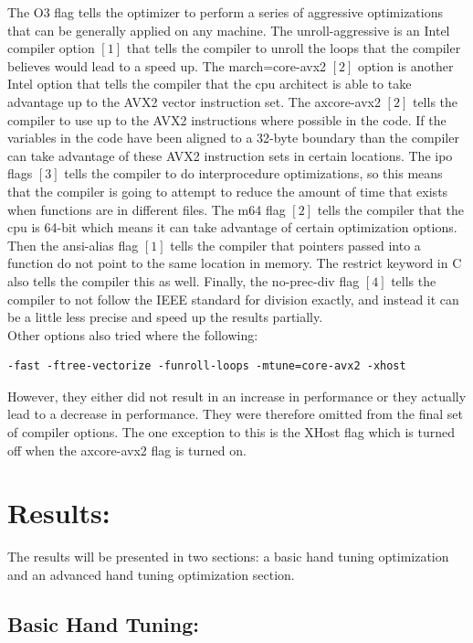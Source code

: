 \documentclass{article}
\begin{document}
The O3 flag tells the optimizer to perform a series of aggressive optimizations that can be generally applied on any machine. The unroll-aggressive is an Intel compiler option $[1]$ that tells the compiler to unroll the loops that the compiler believes would lead to a speed up. The march=core-avx2 $[2]$ option is another Intel option that tells the compiler that the cpu architect is able to take advantage up to the AVX2 vector instruction set. The axcore-avx2 $[2]$ tells the compiler to use up to the AVX2 instructions where possible in the code. If the variables in the code have been aligned to a 32-byte boundary than the compiler can take advantage of these AVX2 instruction sets in certain locations. The ipo flags $[3]$ tells the compiler to do interprocedure optimizations, so this means that the compiler is going to attempt to reduce the amount of time that exists when functions are in different files. The m64 flag $[2]$ tells the compiler that the cpu is 64-bit which means it can take advantage of certain optimization options. Then the ansi-alias flag $[1]$ tells the compiler that pointers passed into a function do not point to the same location in memory. The restrict keyword in C also tells the compiler this as well. Finally, the no-prec-div flag $[4]$ tells the compiler to not follow the IEEE standard for division exactly, and instead it can be a little less precise and speed up the results partially. \\

Other options also tried where the following:

\begin{verbatim}
-fast -ftree-vectorize -funroll-loops -mtune=core-avx2 -xhost
\end{verbatim}

\noindent However, they either did not result in an increase in performance or they actually lead to a decrease in performance. They were therefore omitted from the final set of compiler options. The one exception to this is the XHost flag which is turned off when the axcore-avx2 flag is turned on.

\section*{Results:}

The results will be presented in two sections: a basic hand tuning optimization and an advanced hand tuning optimization section.

\subsection*{Basic Hand Tuning:}
\end{document}
